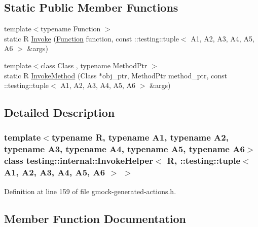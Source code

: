 \subsection*{Static Public Member Functions}
\begin{DoxyCompactItemize}
\item 
{\footnotesize template$<$typename Function $>$ }\\static R \hyperlink{classtesting_1_1internal_1_1InvokeHelper_3_01R_00_01_1_1testing_1_1tuple_3_01A1_00_01A2_00_01A3_129338555c00c55487bfe9fa59e479ab_abd80fc3954d529303e56f4410db782fc}{Invoke} (\hyperlink{structtesting_1_1internal_1_1Function}{Function} function, const \+::testing\+::tuple$<$ A1, A2, A3, A4, A5, A6 $>$ \&args)
\item 
{\footnotesize template$<$class Class , typename Method\+Ptr $>$ }\\static R \hyperlink{classtesting_1_1internal_1_1InvokeHelper_3_01R_00_01_1_1testing_1_1tuple_3_01A1_00_01A2_00_01A3_129338555c00c55487bfe9fa59e479ab_aecdf0f71f5b2c0441b066f62e936805e}{Invoke\+Method} (Class $\ast$obj\+\_\+ptr, Method\+Ptr method\+\_\+ptr, const \+::testing\+::tuple$<$ A1, A2, A3, A4, A5, A6 $>$ \&args)
\end{DoxyCompactItemize}


\subsection{Detailed Description}
\subsubsection*{template$<$typename R, typename A1, typename A2, typename A3, typename A4, typename A5, typename A6$>$\newline
class testing\+::internal\+::\+Invoke\+Helper$<$ R, \+::testing\+::tuple$<$ A1, A2, A3, A4, A5, A6 $>$ $>$}



Definition at line 159 of file gmock-\/generated-\/actions.\+h.



\subsection{Member Function Documentation}
\mbox{\label{classtesting_1_1internal_1_1InvokeHelper_3_01R_00_01_1_1testing_1_1tuple_3_01A1_00_01A2_00_01A3_129338555c00c55487bfe9fa59e479ab_abd80fc3954d529303e56f4410db782fc}} 
